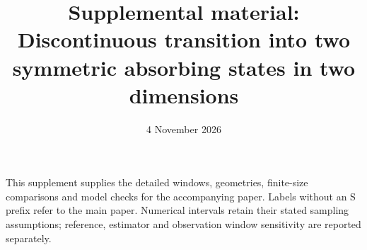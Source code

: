 

\renewcommand{\thesection}{S\Roman{section}}
\renewcommand{\thefigure}{S\arabic{figure}}
\renewcommand{\thetable}{S\Roman{table}}
\renewcommand{\theequation}{S\arabic{equation}}

\title{Supplemental material: Discontinuous transition into two symmetric absorbing states in two dimensions}
\date{4 November 2026}
\maketitle
\raggedbottom
\setlength{\parskip}{0pt}
This supplement supplies the detailed windows, geometries, finite-size
comparisons and model checks for the accompanying paper.
Labels without an S prefix refer to the main paper. Numerical intervals
retain their stated sampling assumptions; reference, estimator and observation
window sensitivity are reported separately.











